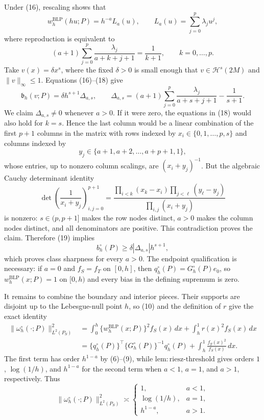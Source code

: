 Under (16), rescaling shows that
\[
w_h^{\mathrm{BLP}}(hu;P)=h^{-a}L_a(u),
\qquad
L_a(u)=\sum_{j=0}^p\lambda_ju^j,
\tag{17}
\]
where reproduction is equivalent to
\[
(a+1)\sum_{j=0}^p\frac{\lambda_j}{a+k+j+1}=\frac1{k+1},
\qquad k=0,\ldots,p.
\tag{18}
\]
Take \(v(x)=\delta x^s\), where the fixed \(\delta>0\) is small enough that
\(v\in\mathcal H^s(2M)\) and \(\|v\|_\infty\le1\). Equations (16)--(18) give
\[
\mathfrak b_h(v;P)=\delta h^{s+1}\Delta_{a,s},
\qquad
\Delta_{a,s}=(a+1)\sum_{j=0}^p\frac{\lambda_j}{a+s+j+1}-\frac1{s+1}.
\tag{19}
\]
We claim \(\Delta_{a,s}\ne0\) whenever \(a>0\). If it were zero, the equations in (18) would also hold for \(k=s\). Hence the last column would be a linear combination of the first \(p+1\) columns in the matrix with rows indexed by \(x_i\in\{0,1,\ldots,p,s\}\) and columns indexed by
\[
y_j\in\{a+1,a+2,\ldots,a+p+1,1\},
\]
whose entries, up to nonzero column scalings, are \((x_i+y_j)^{-1}\). But the algebraic Cauchy determinant identity
\[
\det\left(\frac1{x_i+y_j}\right)_{i,j=0}^{p+1}
=
\frac{\prod_{i<k}(x_k-x_i)\prod_{j<\ell}(y_\ell-y_j)}
{\prod_{i,j}(x_i+y_j)}
\tag{20}
\]
is nonzero: \(s\in(p,p+1]\) makes the row nodes distinct, \(a>0\) makes the column nodes distinct, and all denominators are positive. This contradiction proves the claim. Therefore (19) implies
\[
b_h^{\circ}(P)\ge\delta|\Delta_{a,s}|h^{s+1},
\tag{21}
\]
which proves class sharpness for every \(a>0\). The endpoint qualification is necessary: if \(a=0\) and \(f_S=f_T\) on \([0,h]\), then \(q_h^{\circ}(P)=G_h^{\circ}(P)e_0\), so \(w_h^{\mathrm{BLP}}(x;P)=1\) on \([0,h)\) and every bias in the defining supremum is zero.

It remains to combine the boundary and interior pieces. Their supports are disjoint up to the Lebesgue-null point \(h\), so (10) and the definition of \(r\) give the exact identity
\[
\begin{aligned}
\|\omega_h^{\circ}(\cdot;P)\|_{L^2(P_S)}^2
&=\int_0^h\{w_h^{\mathrm{BLP}}(x;P)\}^2f_S(x)\,dx
  +\int_h^1r(x)^2f_S(x)\,dx\\
&=\{q_h^{\circ}(P)\}^\top\{G_h^{\circ}(P)\}^{-1}q_h^{\circ}(P)
  +\int_h^1\frac{f_T(x)^2}{f_S(x)}\,dx.
\end{aligned}
\tag{22}
\]
The first term has order \(h^{1-a}\) by (6)--(9), while
\(\mathrm{lem:riesz\text{-}threshold}\) gives orders \(1\), \(\log(1/h)\), and
\(h^{1-a}\) for the second term when \(a<1\), \(a=1\), and \(a>1\), respectively. Thus
\[
\|\omega_h^{\circ}(\cdot;P)\|_{L^2(P_S)}^2\asymp
\begin{cases}
1,&a<1,\\
\log(1/h),&a=1,\\
h^{1-a},&a>1.
\end{cases}
\tag{23}
\]

